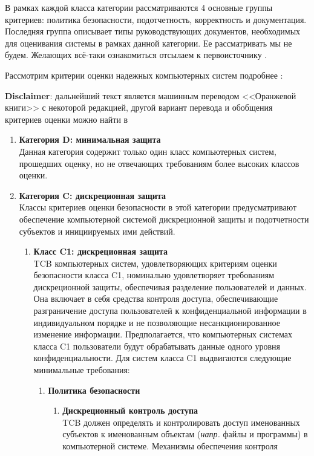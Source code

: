 В рамках каждой класса категории рассматриваются 4 основные группы критериев: политика безопасности, подотчетность, корректность и документация. Последняя группа описывает типы руководствующих
документов, необходимых для оценивания системы в рамках данной категории. Ее рассматривать мы не будем. Желающих всё-таки ознакомиться отсылаем к первоисточнику \cite{OrangeBook}.

Рассмотрим критерии оценки надежных компьютерных систем подробнее \cite[Part 1]{OrangeBook}:

\textbf{Disclaimer}: дальнейший текст является машинным переводом <<Оранжевой книги>> с некоторой редакцией, другой вариант перевода и
обобщения критериев оценки можно найти в \cite{OrangeBookTranslation}

\begin{enumerate}
	\item{\textbf{Категория D: минимальная защита}}\\
	Данная категория содержит только один класс компьютерных систем, прошедших оценку, но не отвечающих требованиям более высоких классов оценки.
	\item{\textbf{Категория C: дискреционная защита}}\\
	Классы критериев оценки безопасности в этой категории предусматривают обеспечение компьютерной системой дискреционной защиты и подотчетности субъектов и инициируемых ими действий.
	\begin{enumerate}
		\item{\textbf{Класс C1: дискреционная защита}}\\
		TCB компьютерных систем, удовлетворяющих критериям оценки безопасности класса C1, номинально удовлетворяет требованиям дискреционной защиты, обеспечивая разделение пользователей и данных.
		Она включает в себя средства контроля доступа, обеспечивающие разграничение доступа пользователей к конфиденциальной информации в индивидуальном порядке и не позволяющие несанкционированное
		изменение информации. Предполагается, что компьютерных системах класса C1 пользователи будут обрабатывать данные одного уровня конфиденциальности. Для систем класса C1 выдвигаются следующие
		минимальные требования:
		\begin{enumerate}
			\item{\textbf{Политика безопасности}}
			\begin{enumerate}
				\item{\textbf{Дискреционный контроль доступа}}\\
				TCB должен определять и контролировать доступ именованных субъектов к именованным объектам (\textit{напр.} файлы и программы) в компьютерной системе. Механизмы обеспечения контроля

\end{enumerate}
\end{enumerate}
\end{enumerate}
\end{enumerate}

